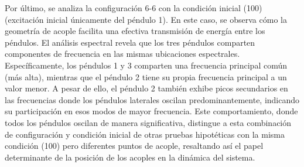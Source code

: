 Por \'ultimo, se analiza la configuraci\'on 6-6 con la condici\'on
inicial (100) (excitaci\'on inicial \'unicamente del p\'endulo 1).
En este caso, se observa c\'omo la geometr\'ia de acople facilita una
efectiva transmisi\'on de energ\'ia entre los p\'endulos. El an\'alisis
espectral revela que los tres p\'endulos comparten componentes de
frecuencia en las mismas ubicaciones espectrales. Espec\'ificamente,
los p\'endulos 1 y 3 comparten una frecuencia principal com\'un (m\'as
alta), mientras que el p\'endulo 2 tiene su propia frecuencia
principal a un valor menor. A pesar de ello, el p\'endulo 2 tambi\'en
exhibe picos secundarios en las frecuencias donde los p\'endulos
laterales oscilan predominantemente, indicando su participaci\'on en
esos modos de mayor frecuencia. Este comportamiento, donde todos los
p\'endulos oscilan de manera significativa, distingue a esta
combinaci\'on de configuraci\'on y condici\'on inicial de otras
pruebas hipot\'eticas con la misma condici\'on (100) pero diferentes
puntos de acople, resaltando as\'i el papel determinante de la
posici\'on de los acoples en la din\'amica del sistema.
